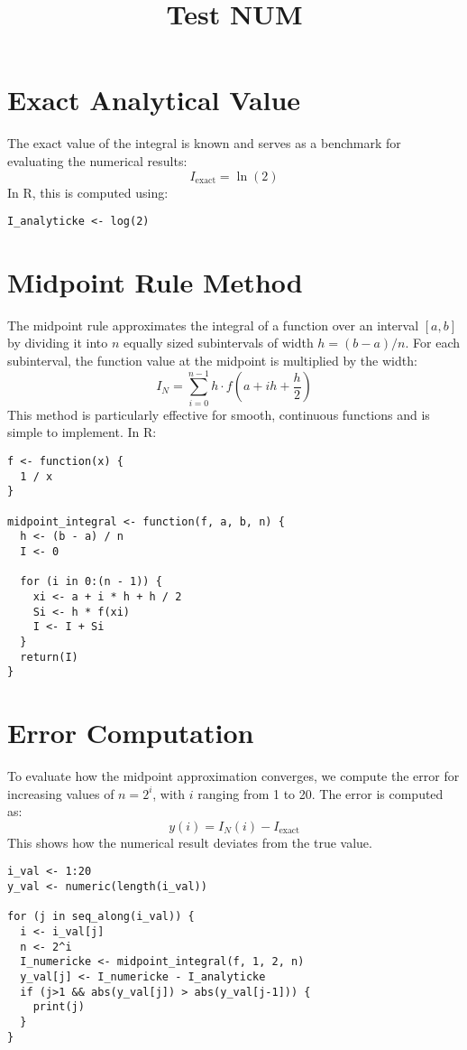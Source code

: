 \documentclass[a4paper,12pt]{article}
\title{Test NUM}
\author{}
\date{}
\begin{document}
\maketitle
\tableofcontents
\newpage

\section{Exact Analytical Value}
The exact value of the integral is known and serves as a benchmark for evaluating the numerical results:
\[ I_\text{exact} = \ln(2) \]
In R, this is computed using:

\begin{lstlisting}[caption=Exact value of the integral]
I_analyticke <- log(2)
\end{lstlisting}

\section{Midpoint Rule Method}
The midpoint rule approximates the integral of a function over an interval $[a, b]$ by dividing it into $n$ equally sized subintervals of width $h = (b - a) / n$. For each subinterval, the function value at the midpoint is multiplied by the width:
\[ I_N = \sum_{i=0}^{n-1} h \cdot f\left(a + i h + \frac{h}{2}\right) \]
This method is particularly effective for smooth, continuous functions and is simple to implement. In R:

\begin{lstlisting}[caption=Midpoint rule function in R]
f <- function(x) {
  1 / x
}

midpoint_integral <- function(f, a, b, n) {
  h <- (b - a) / n
  I <- 0

  for (i in 0:(n - 1)) {
    xi <- a + i * h + h / 2
    Si <- h * f(xi)
    I <- I + Si
  }
  return(I)
}
\end{lstlisting}
\section{Error Computation}
To evaluate how the midpoint approximation converges, we compute the error for increasing values of $n = 2^i$, with $i$ ranging from 1 to 20. The error is computed as:
\[ y(i) = I_N(i) - I_\text{exact} \]
This shows how the numerical result deviates from the true value.

\begin{lstlisting}[caption=Compute midpoint error for i = 1 to 20]
i_val <- 1:20
y_val <- numeric(length(i_val))

for (j in seq_along(i_val)) {
  i <- i_val[j]
  n <- 2^i
  I_numericke <- midpoint_integral(f, 1, 2, n)
  y_val[j] <- I_numericke - I_analyticke
  if (j>1 && abs(y_val[j]) > abs(y_val[j-1])) {
    print(j)
  }
}
\end{lstlisting}
\end{document}
